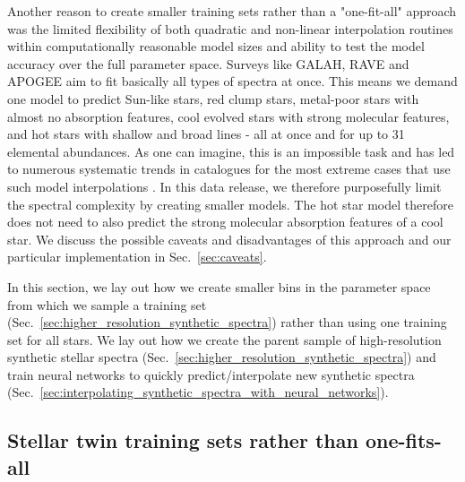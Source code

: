 \documentclass[
  journal=pasa,
  manuscript=research-paper, %
  year=2023,
  volume=37
]{cup-journal}
\begin{document}
Another reason to create smaller training sets rather than a "one-fit-all" approach was the limited flexibility of both quadratic and non-linear interpolation routines within computationally reasonable model sizes and ability to test the model accuracy over the full parameter space. Surveys like GALAH, RAVE and APOGEE aim to fit basically all types of spectra at once. This means we demand one model to predict Sun-like stars, red clump stars, metal-poor stars with almost no absorption features, cool evolved stars with strong molecular features, and hot stars with shallow and broad lines - all at once and for up to 31 elemental abundances. As one can imagine, this is an impossible task and has led to numerous systematic trends in catalogues for the most extreme cases that use such model interpolations \citet{Casey2016,Buder2018,Ting2019}. In this data release, we therefore purposefully limit the spectral complexity by creating smaller models. The hot star model therefore does not need to also predict the strong molecular absorption features of a cool star. We discuss the possible caveats and disadvantages of this approach and our particular implementation in Sec.~\ref{sec:caveats}.

In this section, we lay out how we create smaller bins in the parameter space from which we sample a training set (Sec.~\ref{sec:higher_resolution_synthetic_spectra}) rather than using one training set for all stars. We lay out how we create the parent sample of high-resolution synthetic stellar spectra (Sec.~\ref{sec:higher_resolution_synthetic_spectra}) and train neural networks to quickly predict/interpolate new synthetic spectra (Sec.~\ref{sec:interpolating_synthetic_spectra_with_neural_networks}).

\subsection{Stellar twin training sets rather than one-fits-all}
\label{sec:spectrum_grid}
\end{document}
